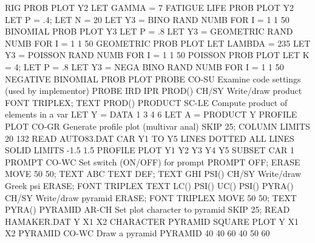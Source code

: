                                   RIG PROB PLOT Y2
                                  LET GAMMA = 7
                                  FATIGUE LIFE PROB PLOT Y2
                                  LET P = .4; LET N = 20
                                  LET Y3 = BINO RAND NUMB FOR I = 1 1 50
                                  BINOMIAL PROB PLOT Y3
                                  LET P = .8
                                  LET Y3 = GEOMETRIC RAND NUMB FOR I = 1 1 50
                                  GEOMETRIC PROB PLOT
                                  LET LAMBDA = 235
                                  LET Y3 = POISSON RAND NUMB FOR I = 1 1 50
                                  POISSON PROB PLOT
                                  LET K = 4; LET P = .8
                                  LET Y3 = NEGA BINO RAND NUMB FOR I = 1 1 50
                                  NEGATIVE BINOMIAL PROB PLOT
PROBE                       CO-SU Examine code settings (used by implementor)
                                  PROBE IRD IPR
PROD()                      CH/SY Write/draw product
                                  FONT TRIPLEX; TEXT PROD()
PRODUCT                     SC-LE Compute product of elements in a var
                                  LET Y = DATA 1 3 4 6
                                  LET A = PRODUCT Y
PROFILE PLOT                CO-GR Generate profile plot (multivar anal)
                                  SKIP 25; COLUMN LIMITS 20 132
                                  READ AUTO83.DAT CAR Y1 TO Y5
                                  LINES DOTTED ALL
                                  LINES SOLID
                                  LIMITS -1.5 1.5
                                  PROFILE PLOT Y1 Y2 Y3 Y4 Y5 SUBSET CAR 1
PROMPT                      CO-WC Set switch (ON/OFF) for prompt
                                  PROMPT OFF; ERASE
                                  MOVE 50 50; TEXT ABC
                                  TEXT DEF; TEXT GHI
PSI()                       CH/SY Write/draw Greek psi
                                  ERASE; FONT TRIPLEX
                                  TEXT LC() PSI() UC() PSI()
PYRA()                      CH/SY Write/draw pyramid
                                  ERASE; FONT TRIPLEX
                                  MOVE 50 50; TEXT PYRA()
PYRAMID                     AR-CH Set plot character to pyramid
                                  SKIP 25; READ HAMAKER.DAT Y X1 X2
                                  CHARACTER PYRAMID SQUARE
                                  PLOT Y X1 X2
PYRAMID                     CO-WC Draw a pyramid
                                  PYRAMID 40 40 60 40 50 60
 
